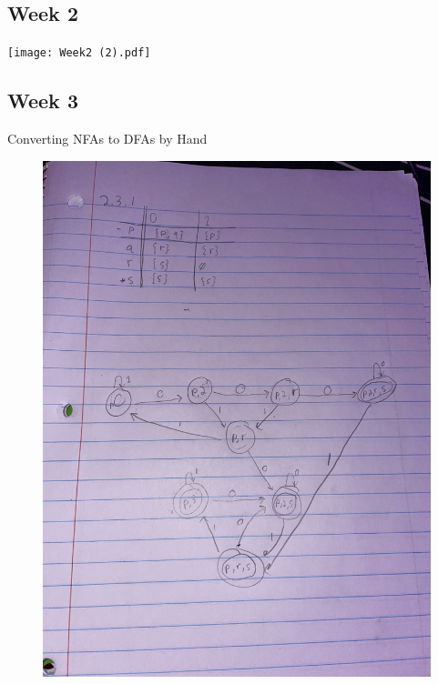 \documentclass{article}
\theoremstyle{theorem}
\theoremstyle{definition}
\theoremstyle{remark}
\begin{document}
\subsection{Week 2}

\medskip\begin{center}
\texttt{[image: Week2 (2).pdf]}
\end{center}

\subsection{Week 3}
Converting NFAs to DFAs by Hand
\medskip\begin{center}
\includegraphics[width=15cm, height=15cm]{Week3.pdf}
\end{center}
\end{document}
